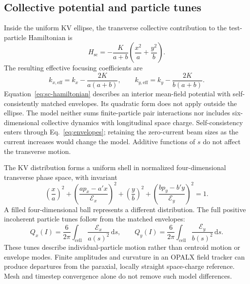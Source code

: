 \documentclass[11pt,a4paper]{article}
\numberwithin{equation}{section}
\begin{document}
\subsection{Collective potential and particle tunes}

Inside the uniform KV ellipse, the transverse collective contribution to
the test-particle Hamiltonian is
\begin{equation}
  H_{\mathrm{sc}}
  =-\frac{K}{a+b}\left(\frac{x^2}{a}+\frac{y^2}{b}\right).
  \label{eq:sc-hamiltonian}
\end{equation}
The resulting effective focusing coefficients are
\begin{equation}
  k_{x,\mathrm{eff}}=k_x-\frac{2K}{a(a+b)},\qquad
  k_{y,\mathrm{eff}}=k_y-\frac{2K}{b(a+b)}.
  \label{eq:effective-focusing}
\end{equation}
Equation~\eqref{eq:sc-hamiltonian} describes an interior mean-field
potential with self-consistently matched envelopes. Its quadratic form
does not apply outside the ellipse. The model neither sums
finite-particle pair interactions nor includes six-dimensional collective
dynamics with longitudinal space charge. Self-consistency enters through
Eq.~\eqref{eq:envelopes}; retaining the zero-current beam sizes as the
current increases would change the model. Additive functions of $s$ do
not affect the transverse motion.

The KV distribution forms a uniform shell in normalized four-dimensional
transverse phase space, with invariant
\begin{equation}
  \left(\frac{x}{a}\right)^2
  +\left(\frac{ap_x-a'x}{\mathcal E_x}\right)^2
  +\left(\frac{y}{b}\right)^2
  +\left(\frac{bp_y-b'y}{\mathcal E_y}\right)^2=1.
  \label{eq:kv-invariant}
\end{equation}
A filled four-dimensional ball represents a different distribution. The
full positive incoherent particle tunes follow from the matched envelopes:
\begin{equation}
  Q_x(I)=\frac{6}{2\pi}\int_{\mathrm{cell}}
             \frac{\mathcal E_x}{a(s)^2}\,\mathrm ds,\qquad
  Q_y(I)=\frac{6}{2\pi}\int_{\mathrm{cell}}
             \frac{\mathcal E_y}{b(s)^2}\,\mathrm ds.
  \label{eq:kv-tunes}
\end{equation}
These tunes describe individual-particle motion rather than centroid
motion or envelope modes. Finite amplitudes and curvature in an OPALX
field tracker can produce departures from the paraxial, locally straight
space-charge reference. Mesh and timestep convergence alone do not remove
such model differences.
\end{document}
